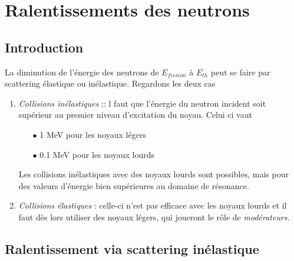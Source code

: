 \chapter{Ralentissements des neutrons}
\section{Introduction}
La diminution de l'énergie des neutrons de $E_{fission}$ à $E_{th}$ peut se faire par scattering 
élastique ou inélastique. Regardons les deux cas
\begin{enumerate}
\item \textit{Collisions inélastiques} :: l faut que l'énergie du neutron incident soit supérieur au 
premier niveau d'excitation du noyau. Celui ci vaut
\begin{itemize}
\item[$\bullet$] 1 MeV pour les noyaux légers
\item[$\bullet$] 0.1 MeV pour les noyaux lourds
\end{itemize}
Les collisions inélastiques avec des noyaux lourds sont possibles, mais pour des valeurs d'énergie
bien supérieures au domaine de résonance.
\item \textit{Collisions élastiques} : celle-ci n'est pas efficace avec les noyaux lourds et il faut
dès lors utiliser des noyaux légers, qui joueront le rôle de \textit{modérateurs}.
\end{enumerate}

\section{Ralentissement via scattering inélastique}
